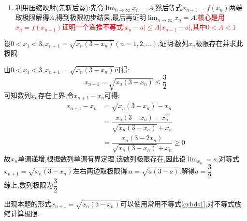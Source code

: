 \documentclass[8pt a4paper, oneside, UTF8]{ctexbook}
\begin{document}
\begin{sloppypar}
\begin{enumerate}
\begin{enumerate}
\begin{itemize}
\begin{proof}
\begin{center}
                                      \end{center}
                                  \end{proof}
                        \end{itemize}
              \end{enumerate}
        \item 利用压缩映射(先斩后奏):先令$\lim_{n\to\infty} x_n=A$,然后等式$x_{n+1}=f(x_n)$两端取极限解得$A$,得到极限初步结果,最后再证明$\lim_{n\to\infty} x_n=A$.\textcolor{red}{核心是用$x_n=f(x_{n-1})$证明一个递推不等式$|x_n-a| \leqslant A|x_{n-1}-a|$,其中$0<A<1$}
    \end{enumerate}
    \begin{problem}
    设$0<x_1<3,x_{n+1}=\sqrt{x_n\left(3-x_n\right)}\left(n=1,2,...\right)$,证明:数列$x_n$极限存在并求此极限
    \end{problem}
    \begin{solution}
        由$0<x_1<3,x_{n+1}=\sqrt{x_n(3-x_n)}$可得:
        $$
            x_{n+1}=\sqrt{x_n(3-x_n)}\leqslant \dfrac{3}{2}
        $$
        可知数列$x_n$存在上界,令$x_{n+1}-x_n$可得:
        \begin{align*}
            x_{n+1}-x_n & = \sqrt{x_n(3-x_n)}-x_n                                \\
                        & = \dfrac{x_n(3-x_n)-x_n^2}{\sqrt{x_n(3-x_n)}+x_n}      \\
                        & = \dfrac{x_n(3-2x_n)}{\sqrt{x_n(3-x_n)}+x_n}\geqslant0
        \end{align*}
        故$x_n$单调递增,根据数列单调有界定理,该数列极限存在,因此设$\lim_{x_n}=a$,对等式$x_{n+1}=\sqrt{x_n(3-x_n)}$左右两边取极限得:$a=\sqrt{a(3-a)}$.解得$a=\dfrac{3}{2}$\\综上,数列极限为$\dfrac{3}{2}$
    \end{solution}
    \begin{note}
        出现本题的形式$x_{n+1}=\sqrt{x_n(3-x_n)}$可以使用常用不等式\ref{cybds1},对不等式放缩计算极限.
    \end{note}
    \begin{problem}

\end{problem}
\end{sloppypar}
\end{document}
